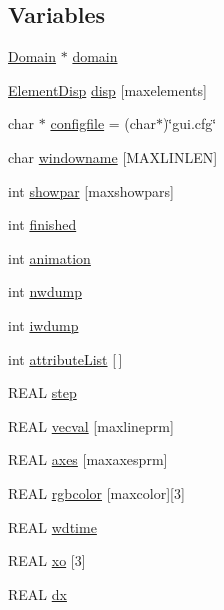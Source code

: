 \subsection*{Variables}
\begin{CompactItemize}
\item 
\hyperlink{classDomain}{Domain} $\ast$ \hyperlink{namespaceGui_60f6d8ae2497f90f2e3bad7a69c27f1d}{domain}
\item 
\hyperlink{structGui_1_1ElementDisp}{ElementDisp} \hyperlink{namespaceGui_a3da3aa4111d6dc26f3f40324c8f52d3}{disp} \mbox{[}maxelements\mbox{]}
\item 
char $\ast$ \hyperlink{namespaceGui_6702af97844e9ea00bded3ffb073c223}{configfile} = (char$\ast$)\char`\"{}gui.cfg\char`\"{}
\item 
char \hyperlink{namespaceGui_05e5a56061d9b709de0cbf9c54640465}{windowname} \mbox{[}MAXLINLEN\mbox{]}
\item 
int \hyperlink{namespaceGui_aa991dcea49b723b5d30bbf0fa3cec6c}{showpar} \mbox{[}maxshowpars\mbox{]}
\item 
int \hyperlink{namespaceGui_d167a9a00b5fcd633d94be01594f97c6}{finished}
\item 
int \hyperlink{namespaceGui_8e6788190d414f842e08826fcefa496c}{animation}
\item 
int \hyperlink{namespaceGui_d5d34028af9532dba173542e87d23f56}{nwdump}
\item 
int \hyperlink{namespaceGui_85922779b0101fa854b9b70a316998bd}{iwdump}
\item 
int \hyperlink{namespaceGui_a57d40ab8d008d5fd9e51830e254f2f8}{attributeList} \mbox{[}$\,$\mbox{]}
\item 
REAL \hyperlink{namespaceGui_8ef4f3e30c066fc451103c29d312ebfc}{step}
\item 
REAL \hyperlink{namespaceGui_7cfc73b4cf3c43f2eae07648ed332adf}{vecval} \mbox{[}maxlineprm\mbox{]}
\item 
REAL \hyperlink{namespaceGui_d8cd720a8150fa90f583d180f6a83b99}{axes} \mbox{[}maxaxesprm\mbox{]}
\item 
REAL \hyperlink{namespaceGui_e32ed5f0f6c168d88ee4dcfcb237aa7a}{rgbcolor} \mbox{[}maxcolor\mbox{]}\mbox{[}3\mbox{]}
\item 
REAL \hyperlink{namespaceGui_4e0f39982d5320819b7ce9a6aec7ee4f}{wdtime}
\item 
REAL \hyperlink{namespaceGui_0ed0ea23e3f4484056c1581a73b38f95}{xo} \mbox{[}3\mbox{]}
\item 
REAL \hyperlink{namespaceGui_447643e9fc2878cea10d5d51fe076fd8}{dx}

\end{CompactItemize}

